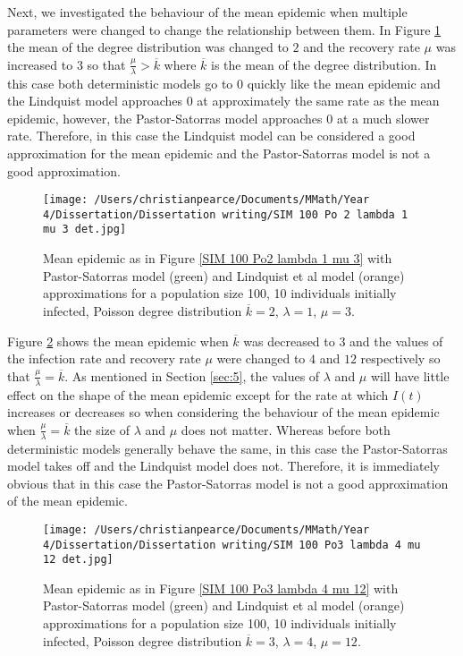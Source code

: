 \documentclass{uonmathsreport}
\begin{document}
Next, we investigated the behaviour of the mean epidemic when multiple parameters were changed to change the relationship between them. In Figure \ref{7.9} the mean of the degree distribution was changed to $2$ and the recovery rate $\mu$ was increased to $3$ so that $\frac{\mu}{\lambda}>\overline{k}$ where $\overline{k}$ is the mean of the degree distribution. In this case both deterministic models go to $0$ quickly like the mean epidemic and the Lindquist model approaches $0$ at approximately the same rate as the mean epidemic, however, the Pastor-Satorras model approaches $0$ at a much slower rate. Therefore, in this case the Lindquist model can be considered a good approximation for the mean epidemic and the Pastor-Satorras model is not a good approximation.

\begin{figure}
\begin{center}
\texttt{[image: /Users/christianpearce/Documents/MMath/Year 4/Dissertation/Dissertation writing/SIM 100 Po 2 lambda 1 mu 3 det.jpg]}
\end{center}
\caption{Mean epidemic as in Figure \ref{SIM 100 Po2 lambda 1 mu 3} with Pastor-Satorras model (green) and Lindquist et al model (orange) approximations for a population size 100, 10 individuals initially infected, Poisson degree distribution $\overline{k}=2$, $\lambda=1$, $\mu=3$.}
\label{7.9}
\end{figure}

Figure \ref{7.10} shows the mean epidemic when $\overline{k}$ was decreased to $3$ and the values of the infection rate and recovery rate $\mu$ were changed to $4$ and $12$ respectively so that $\frac{\mu}{\lambda}=\overline{k}$. As mentioned in Section \ref{sec:5}, the values of $\lambda$ and $\mu$ will have little effect on the shape of the mean epidemic except for the rate at which $I(t)$ increases or decreases so when considering the behaviour of the mean epidemic when $\frac{\mu}{\lambda}=\overline{k}$ the size of $\lambda$ and $\mu$ does not matter. Whereas before both deterministic models generally behave the same, in this case the Pastor-Satorras model takes off and the Lindquist model does not. Therefore, it is immediately obvious that in this case the Pastor-Satorras model is not a good approximation of the mean epidemic.

\begin{figure}
\begin{center}
\texttt{[image: /Users/christianpearce/Documents/MMath/Year 4/Dissertation/Dissertation writing/SIM 100 Po3 lambda 4 mu 12 det.jpg]}
\end{center}
\caption{Mean epidemic as in Figure \ref{SIM 100 Po3 lambda 4 mu 12} with Pastor-Satorras model (green) and Lindquist et al model (orange) approximations for a population size 100, 10 individuals initially infected, Poisson degree distribution $\overline{k}=3$, $\lambda=4$, $\mu=12$.}
\label{7.10}
\end{figure}
\end{document}
